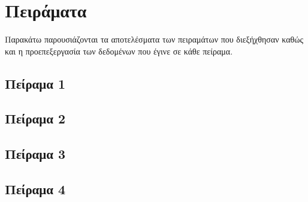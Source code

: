 \section{Πειράματα}
Παρακάτω παρουσιάζονται τα αποτελέσματα των πειραμάτων που διεξήχθησαν καθώς και η προεπεξεργασία
των δεδομένων που έγινε σε κάθε πείραμα.

\subsection{Πείραμα 1}
\subsection{Πείραμα 2}
\subsection{Πείραμα 3}
\subsection{Πείραμα 4}